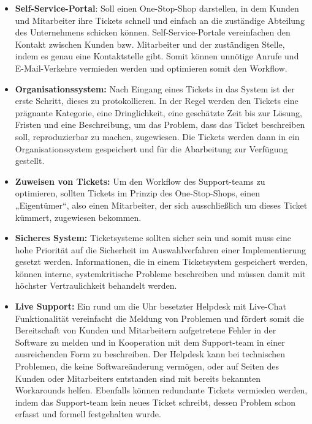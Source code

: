   \begin{itemize}
	  \item 	\textbf{Self-Service-Portal}: Soll einen One-Stop-Shop darstellen, in dem Kunden und Mitarbeiter ihre Tickets schnell und einfach an die zuständige Abteilung des Unternehmens schicken können. Self-Service-Portale vereinfachen den Kontakt zwischen Kunden bzw. Mitarbeiter und der zuständigen Stelle, indem es genau eine Kontaktstelle gibt. Somit können unnötige Anrufe und E-Mail-Verkehre vermieden werden und optimieren somit den Workflow.  \\
	  \item \textbf{	Organisationssystem:} Nach Eingang eines Tickets in das System ist der erste Schritt, dieses zu protokollieren. In der Regel werden den Tickets eine prägnante Kategorie, eine Dringlichkeit, eine geschätzte Zeit bis zur Lösung, Fristen und eine Beschreibung, um das Problem, dass das Ticket beschreiben soll, reproduzierbar zu machen, zugewiesen. Die Tickets werden dann in ein Organisationssystem gespeichert und für die Abarbeitung zur Verfügung gestellt.  \\
	  \item \textbf{Zuweisen von Tickets:} Um den Workflow des Support-teams zu optimieren, sollten Tickets im Prinzip des One-Stop-Shops, einen „Eigentümer“, also einen Mitarbeiter, der sich ausschließlich um dieses Ticket kümmert, zugewiesen bekommen.  \\
	  \item \textbf{	Sicheres System:} Ticketsysteme sollten sicher sein und somit muss eine hohe Priorität auf die Sicherheit im Auswahlverfahren einer Implementierung gesetzt werden. Informationen, die in einem Ticketsystem gespeichert werden, können interne, systemkritische Probleme beschreiben und müssen damit mit höchster Vertraulichkeit behandelt werden. \\
	  \item \textbf{Live Support:} Ein rund um die Uhr besetzter Helpdesk mit Live-Chat Funktionalität vereinfacht die Meldung von Problemen und fördert somit die Bereitschaft von Kunden und Mitarbeitern aufgetretene Fehler in der Software zu melden und in Kooperation mit dem Support-team in einer ausreichenden Form zu beschreiben. Der Helpdesk kann bei technischen Problemen, die keine Softwareänderung vermögen, oder auf Seiten des Kunden oder Mitarbeiters entstanden sind mit bereits bekannten Workarounds helfen. Ebenfalls können redundante Tickets vermieden werden, indem das Support-team kein neues Ticket schreibt, dessen Problem schon erfasst und formell festgehalten wurde. \\
  \end{itemize}
  
